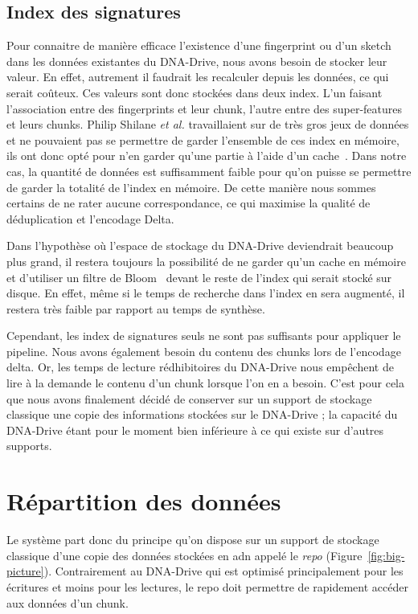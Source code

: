 \documentclass[a4paper]{report}
\makeatletter
\newcommand{\etal}{\emph{et al.}\@\xspace}
\makeatother
\begin{document}
\subsection{Index des signatures}
Pour connaitre de manière efficace l'existence d'une fingerprint ou d'un sketch dans les données existantes du DNA-Drive, nous avons besoin de stocker leur valeur.
En effet, autrement il faudrait les recalculer depuis les données, ce qui serait coûteux.
Ces valeurs sont donc stockées dans deux index.
L'un faisant l'association entre des fingerprints et leur chunk, l'autre entre des super-features et leurs chunks.
Philip Shilane \etal travaillaient sur de très gros jeux de données et ne pouvaient pas se permettre de garder l'ensemble de ces index en mémoire, ils ont donc opté pour n'en garder qu'une partie à l'aide d'un cache~\cite{shilane2012wan}.
Dans notre cas, la quantité de données est suffisamment faible pour qu'on puisse se permettre de garder la totalité de l'index en mémoire.
De cette manière nous sommes certains de ne rater aucune correspondance, ce qui maximise la qualité de déduplication et l'encodage Delta.

Dans l'hypothèse où l'espace de stockage du DNA-Drive deviendrait beaucoup plus grand, il restera toujours la possibilité de ne garder qu'un cache en mémoire et d'utiliser un filtre de Bloom~\cite{bloom1970space} devant le reste de l'index qui serait stocké sur disque.
En effet, même si le temps de recherche dans l'index en sera augmenté, il restera très faible par rapport au temps de synthèse.

Cependant, les index de signatures seuls ne sont pas suffisants pour appliquer le pipeline.
Nous avons également besoin du contenu des chunks lors de l'encodage delta.
Or, les temps de lecture rédhibitoires du DNA-Drive nous empêchent de lire à la demande le contenu d'un chunk lorsque l'on en a besoin.
C'est pour cela que nous avons finalement décidé de conserver sur un support de stockage classique une copie des informations stockées sur le DNA-Drive ;
la capacité du DNA-Drive étant pour le moment bien inférieure à ce qui existe sur d'autres supports.


\section{Répartition des données}

Le système part donc du principe qu'on dispose sur un support de stockage classique d'une copie des données stockées en \ac{adn} appelé le \emph{repo} (Figure~\ref{fig:big-picture}).
Contrairement au DNA-Drive qui est optimisé principalement pour les écritures et moins pour les lectures,
le repo doit permettre de rapidement accéder aux données d'un chunk.
\end{document}

